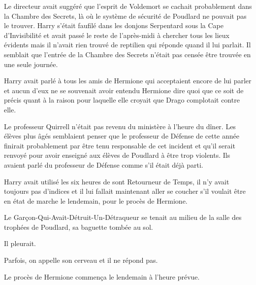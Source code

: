 Le directeur avait suggéré que l'esprit de Voldemort se cachait probablement dans la Chambre des Secrets, là où le système de sécurité de Poudlard ne pouvait pas le trouver. Harry s'était faufilé dans les donjons Serpentard sous la Cape d'Invisibilité et avait passé le reste de l'après-midi à chercher tous les lieux évidents mais il n'avait rien trouvé de reptilien qui réponde quand il lui parlait. Il semblait que l'entrée de la Chambre des Secrets n'était pas censée être trouvée en une seule journée.

Harry avait parlé à tous les amis de Hermione qui acceptaient encore de lui parler et aucun d'eux ne se souvenait avoir entendu Hermione dire quoi que ce soit de précis quant à la raison pour laquelle elle croyait que Drago complotait contre elle.

Le professeur Quirrell n'était pas revenu du ministère à l'heure du dîner. Les élèves plus âgés semblaient penser que le professeur de Défense de cette année finirait probablement par être tenu responsable de cet incident et qu'il serait renvoyé pour avoir enseigné aux élèves de Poudlard à être trop violents. Ils avaient parlé du professeur de Défense comme s'il était déjà parti.

Harry avait utilisé les six heures de sont Retourneur de Temps, il n'y avait toujours pas d'indices et il lui fallait maintenant aller se coucher s'il voulait être en état de marche le lendemain, pour le procès de Hermione.

Le Garçon-Qui-Avait-Détruit-Un-Détraqueur se tenait au milieu de la salle des trophées de Poudlard, sa baguette tombée au sol.

Il pleurait.

Parfois, on appelle son cerveau et il ne répond pas.

Le procès de Hermione commença le lendemain à l'heure prévue. 

